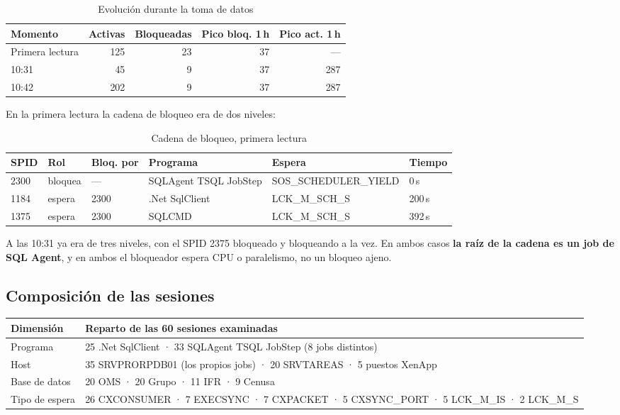 \documentclass[11pt,a4paper]{article}
\begin{document}
\begin{table}[h]
\centering
\small
\begin{tabular}{lrrrr}
\toprule
\textbf{Momento} & \textbf{Activas} & \textbf{Bloqueadas} &
\textbf{Pico bloq. 1\,h} & \textbf{Pico act. 1\,h} \\
\midrule
Primera lectura & 125 & 23 & 37 & --- \\
10:31           &  45 &  9 & 37 & 287 \\
10:42           & 202 &  9 & 37 & 287 \\
\bottomrule
\end{tabular}
\caption{Evolución durante la toma de datos}
\end{table}

En la primera lectura la cadena de bloqueo era de dos niveles:

\begin{table}[h]
\centering
\scriptsize
\begin{tabular}{llllll}
\toprule
\textbf{SPID} & \textbf{Rol} & \textbf{Bloq. por} & \textbf{Programa} &
\textbf{Espera} & \textbf{Tiempo} \\
\midrule
2300 & bloquea & --- & SQLAgent TSQL JobStep & SOS\_SCHEDULER\_YIELD & 0\,s \\
1184 & espera  & 2300 & .Net SqlClient       & LCK\_M\_SCH\_S & 200\,s \\
1375 & espera  & 2300 & SQLCMD               & LCK\_M\_SCH\_S & 392\,s \\
\bottomrule
\end{tabular}
\caption{Cadena de bloqueo, primera lectura}
\end{table}

A las 10:31 ya era de tres niveles, con el SPID 2375 bloqueado y bloqueando
a la vez. En ambos casos \textbf{la raíz de la cadena es un job de SQL
Agent}, y en ambos el bloqueador espera CPU o paralelismo, no un bloqueo
ajeno.

\subsection{Composición de las sesiones}

\begin{table}[h]
\centering
\small
\begin{tabular}{p{3cm}p{10.5cm}}
\toprule
\textbf{Dimensión} & \textbf{Reparto de las 60 sesiones examinadas} \\
\midrule
Programa       & 25 .Net SqlClient · 33 SQLAgent TSQL JobStep (8 jobs distintos) \\
Host           & 35 SRVPRORPDB01 (los propios jobs) · 20 SRVTAREAS · 5 puestos XenApp \\
Base de datos  & 20 OMS · 20 Grupo · 11 IFR · 9 Cenusa \\
Tipo de espera & 26 CXCONSUMER · 7 EXECSYNC · 7 CXPACKET · 5 CXSYNC\_PORT · 5 LCK\_M\_IS · 2 LCK\_M\_S \\
\bottomrule
\end{tabular}
\end{table}
\end{document}
